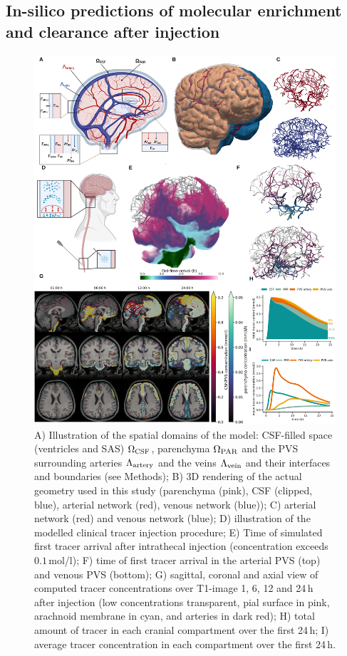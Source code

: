\documentclass[fleqn,10pt]{wlscirep}
\begin{document}
\subsection*{In-silico predictions of molecular enrichment and clearance after injection}
\begin{figure}
    \centering
    \includegraphics[width=0.95 \textwidth]{figures/figure1.png}
     \caption{A) Illustration of the spatial domains of the model: CSF-filled space (ventricles and SAS) $\Omega_{\rm CSF}$, parenchyma $\Omega_{\rm PAR}$ and the PVS surrounding arteries $\Lambda_{\rm artery}$ and the veins $\Lambda_{\rm vein}$ and their interfaces and boundaries (see Methods); B) 3D rendering of the actual geometry used in this study (parenchyma (pink), CSF (clipped, blue), arterial network (red), venous network (blue)); C) arterial network (red) and venous network (blue); D) illustration of the modelled clinical tracer injection procedure; E) Time of simulated first tracer arrival after intrathecal injection (concentration exceeds $0.1\,$mol/l); F) time of first tracer arrival in the arterial PVS (top) and venous PVS (bottom); G) sagittal, coronal and axial view of computed tracer concentrations over T1-image 1, 6, 12 and 24\,h after injection (low concentrations transparent, pial surface in pink, arachnoid membrane in cyan, and arteries in dark red); H) total amount of tracer in each cranial compartment over the first 24\,h; I) average tracer concentration in each compartment over the first 24\,h. }
     \label{fig:results1}
\end{figure}
\end{document}
